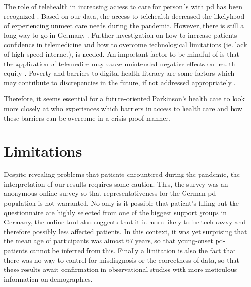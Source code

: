 \documentclass{bmcart}
\begin{document}

The role of telehealth in increasing access to care for person´s with \ac{pd} has been recognized \cite{achey2014past, van2021state}. Based on our data, the access to telehealth decreased the likelyhood of experiencing unmeet care needs during the pandemic. However, there is still a long way to go in Germany \cite{eggers2020care}. Further investigation on how to increase patients confidence in telemedicine and how to overcome technological limitations (ie. lack of high speed internet), is needed. An important factor to be mindful of is that the application of telemedice may cause unintended negative effects on health equity \cite{samuels2021digital}. Poverty and barriers to digital health literacy are some factors which may contribute to discrepancies in the future, if not addressed appropriately \cite{samuels2021digital}. 


Therefore, it seems essential for a future-oriented Parkinson's health care to look more closely at who experiences which barriers in access to health care and how these barriers can be overcome in a crisis-proof manner.

\section*{Limitations}
Despite revealing problems that patients encountered during the pandemic, the interpretation of our results requires some caution. This, the survey was an anonymous online survey so that representativeness for the German \ac{pd} population is not warranted. No only is it possible that patient's filling out the questionnaire are highly selected from one of the biggest support groups in Germany, the online tool also suggests that it is more likely to be tech-savvy and therefore possibly less affected patients. In this context, it was yet surprising that the mean age of participants was almost 67 years, so that young-onset \ac{pd}-patients cannot be inferred from this. Finally a limitation is also the fact that there was no way to control for misdiagnosis or the correctness of data, so that these results await confirmation in observational studies with more meticulous information on demographics.
\end{document}
